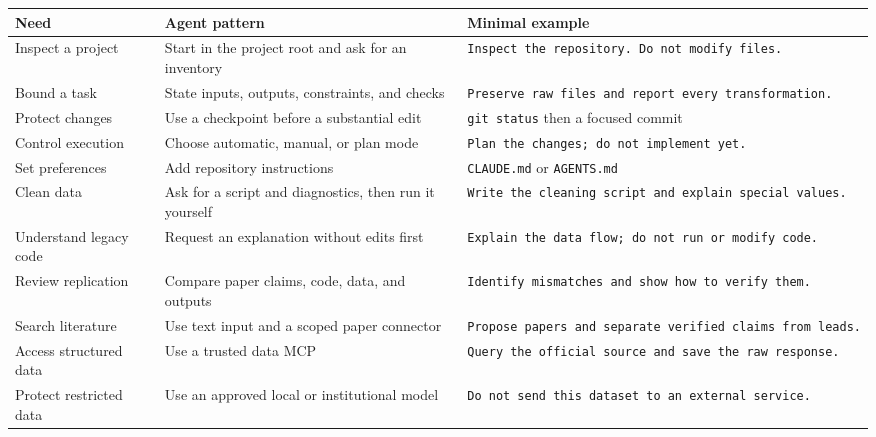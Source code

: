 \documentclass[
  english,
  10pt,
]{article}
\newcounter{none} %
\begin{document}
{\def\LTcaptype{none} %
\begin{longtable}[]{@{}
  >{\raggedright\arraybackslash}p{}
  >{\raggedright\arraybackslash}p{}
  >{\raggedright\arraybackslash}p{}@{}}
\toprule\noalign{}
\begin{minipage}[b]{\linewidth}\raggedright
Need
\end{minipage} & \begin{minipage}[b]{\linewidth}\raggedright
Agent pattern
\end{minipage} & \begin{minipage}[b]{\linewidth}\raggedright
Minimal example
\end{minipage} \\
\midrule\noalign{}
\endhead
\bottomrule\noalign{}
\endlastfoot
Inspect a project & Start in the project root and ask for an inventory &
\texttt{Inspect\ the\ repository.\ Do\ not\ modify\ files.} \\
Bound a task & State inputs, outputs, constraints, and checks &
\texttt{Preserve\ raw\ files\ and\ report\ every\ transformation.} \\
Protect changes & Use a checkpoint before a substantial edit &
\texttt{git\ status} then a focused commit \\
Control execution & Choose automatic, manual, or plan mode &
\texttt{Plan\ the\ changes;\ do\ not\ implement\ yet.} \\
Set preferences & Add repository instructions & \texttt{CLAUDE.md} or
\texttt{AGENTS.md} \\
Clean data & Ask for a script and diagnostics, then run it yourself &
\texttt{Write\ the\ cleaning\ script\ and\ explain\ special\ values.} \\
Understand legacy code & Request an explanation without edits first &
\texttt{Explain\ the\ data\ flow;\ do\ not\ run\ or\ modify\ code.} \\
Review replication & Compare paper claims, code, data, and outputs &
\texttt{Identify\ mismatches\ and\ show\ how\ to\ verify\ them.} \\
Search literature & Use text input and a scoped paper connector &
\texttt{Propose\ papers\ and\ separate\ verified\ claims\ from\ leads.} \\
Access structured data & Use a trusted data MCP &
\texttt{Query\ the\ official\ source\ and\ save\ the\ raw\ response.} \\
Protect restricted data & Use an approved local or institutional model &
\texttt{Do\ not\ send\ this\ dataset\ to\ an\ external\ service.} \\
\end{longtable}
}
\end{document}
